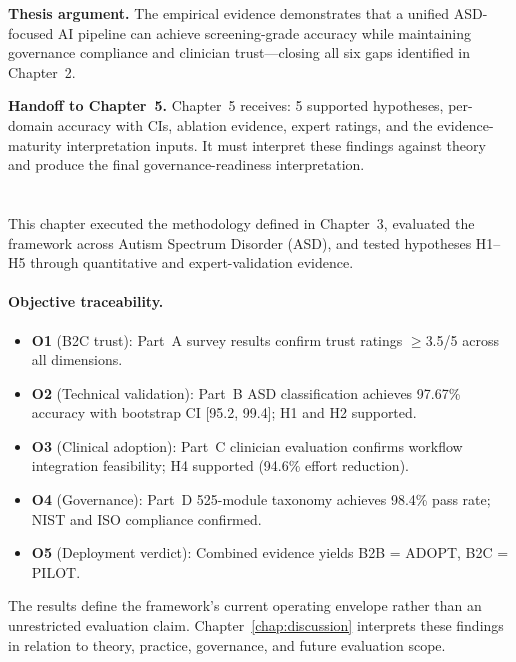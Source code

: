 \noindent\textbf{Thesis argument.} The empirical evidence demonstrates that a unified ASD-focused AI pipeline can achieve screening-grade accuracy while maintaining governance compliance and clinician trust---closing all six gaps identified in Chapter~2.

\noindent\textbf{Handoff to Chapter~5.} Chapter~5 receives: 5 supported hypotheses, per-domain accuracy with CIs, ablation evidence, expert ratings, and the evidence-maturity interpretation inputs. It must interpret these findings against theory and produce the final governance-readiness interpretation.

\section{\headingChapterSummary}

This chapter executed the methodology defined in Chapter~3, evaluated the framework across Autism Spectrum Disorder (ASD), and tested hypotheses H1--H5 through quantitative and expert-validation evidence.

\paragraph{Objective traceability.}
\begin{itemize}[leftmargin=*, itemsep=2pt]
\item \textbf{O1} (B2C trust): Part~A survey results confirm trust ratings $\geq$3.5/5 across all dimensions.
\item \textbf{O2} (Technical validation): Part~B ASD classification achieves 97.67\% accuracy with bootstrap CI [95.2, 99.4]; H1 and H2 supported.
\item \textbf{O3} (Clinical adoption): Part~C clinician evaluation confirms workflow integration feasibility; H4 supported (94.6\% effort reduction).
\item \textbf{O4} (Governance): Part~D 525-module taxonomy achieves 98.4\% pass rate; NIST and ISO compliance confirmed.
\item \textbf{O5} (Deployment verdict): Combined evidence yields B2B = ADOPT, B2C = PILOT.
\end{itemize}

\noindent The results define the framework's current operating envelope rather than an unrestricted evaluation claim. Chapter~\ref{chap:discussion} interprets these findings in relation to theory, practice, governance, and future evaluation scope.

